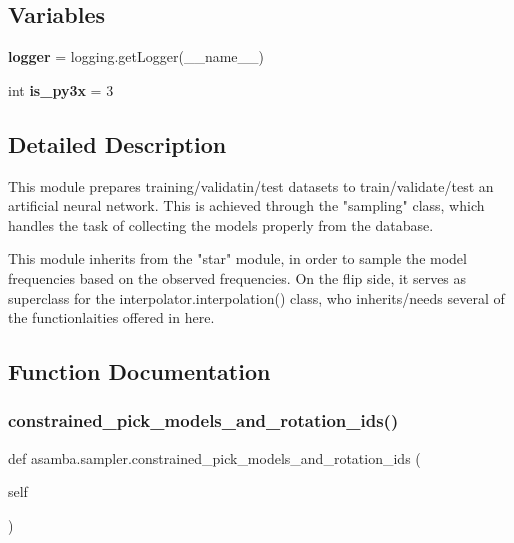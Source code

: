 \subsection*{Variables}
\begin{DoxyCompactItemize}
\item 
\mbox{\label{namespaceasamba_1_1sampler_a31bac990964c19a031da8c2a21900426}} 
{\bfseries logger} = logging.\+get\+Logger(\+\_\+\+\_\+name\+\_\+\+\_\+)
\item 
\mbox{\label{namespaceasamba_1_1sampler_ae80824502e5910a1cfd2852fd042726b}} 
int {\bfseries is\+\_\+py3x} = 3
\end{DoxyCompactItemize}


\subsection{Detailed Description}
\begin{DoxyVerb}This module prepares training/validatin/test datasets to train/validate/test an 
artificial neural network. This is achieved through the "sampling" class, which 
handles the task of collecting the models properly from the database.

This module inherits from the "star" module, in order to sample the model frequencies
based on the observed frequencies. On the flip side, it serves as superclass for the 
interpolator.interpolation() class, who inherits/needs several of the functionlaities 
offered in here. 
\end{DoxyVerb}
 

\subsection{Function Documentation}
\mbox{\label{namespaceasamba_1_1sampler_a35fefd92d9be635fb89924a6778f9315}} 
\subsubsection{\texorpdfstring{constrained\+\_\+pick\+\_\+models\+\_\+and\+\_\+rotation\+\_\+ids()}{constrained\_pick\_models\_and\_rotation\_ids()}}
{\footnotesize\ttfamily def asamba.\+sampler.\+constrained\+\_\+pick\+\_\+models\+\_\+and\+\_\+rotation\+\_\+ids (\begin{DoxyParamCaption}\item[{}]{self }\end{DoxyParamCaption})}

